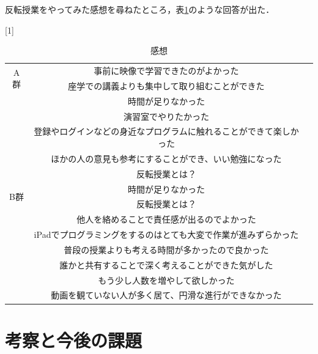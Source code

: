 \documentclass[a4j,11pt]{jsarticle}
\begin{document}
反転授業をやってみた感想を尋ねたところ，表\ref{anke18}のような回答が出た．


\begin{table}[htbp]
\begin{center}
\caption{感想}
\scalebox{1}[1]{
\begin{tabular}{|c|c|c|}
\cline{1-2}
\multicolumn{1}{|c|}{\multirow{2}{*}{A群}} &  事前に映像で学習できたのがよかった  \\ \cline{2-2}  
\multicolumn{1}{|c|}{} & 座学での講義よりも集中して取り組むことができた  \\ \cline{2-2}  
\multicolumn{1}{|c|}{} & 時間が足りなかった  \\ \cline{2-2}  
\multicolumn{1}{|c|}{} & 演習室でやりたかった  \\ \cline{2-2}  
\multicolumn{1}{|c|}{} & 登録やログインなどの身近なプログラムに触れることができて楽しかった \\ \cline{2-2} 
\multicolumn{1}{|c|}{} &  ほかの人の意見も参考にすることができ、いい勉強になった \\ \cline{2-2} 
\multicolumn{1}{|c|}{} &  反転授業とは？ \\ \cline{1-2} 
 \multicolumn{1}{|c|}{\multirow{2}{*}{B群}} & 時間が足りなかった  \\ \cline{2-2}  
\multicolumn{1}{|c|}{} & 反転授業とは？  \\ \cline{2-2}  
\multicolumn{1}{|c|}{} & 他人を絡めることで責任感が出るのでよかった \\ \cline{2-2}  
\multicolumn{1}{|c|}{} &  iPadでプログラミングをするのはとても大変で作業が進みずらかった \\ \cline{2-2}  
\multicolumn{1}{|c|}{} &  普段の授業よりも考える時間が多かったので良かった \\ \cline{2-2}  
\multicolumn{1}{|c|}{} &  誰かと共有することで深く考えることができた気がした \\ \cline{2-2}  
\multicolumn{1}{|c|}{} & もう少し人数を増やして欲しかった  \\ \cline{2-2}  
\multicolumn{1}{|c|}{} & 動画を観ていない人が多く居て、円滑な進行ができなかった  \\ \cline{1-2}  
\end{tabular}
}
\label{anke18}
\end{center}
\end{table}



\newpage
\section{考察と今後の課題}
\end{document}
